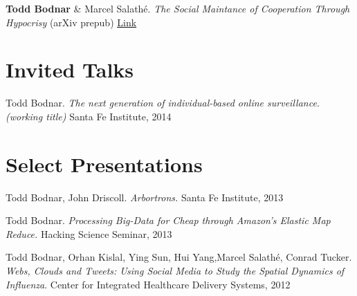 \documentclass[margin,line]{res}
\newcommand{\linkToUrl}[1]{\underline{\color{blue} \href{#1}{Link}}}
\begin{document}
\begin{resume}
\begin{etaremune}[start=3]
\item \textbf{Todd Bodnar} \& Marcel Salath\'e. \textit{The Social Maintance of Cooperation Through Hypocrisy} (arXiv prepub) \linkToUrl{http://bit.ly/Yr965L}

\end{etaremune}

\section{\sc Invited Talks}
\begin{etaremune}[start=1]
\item Todd Bodnar. \textit{The next generation of individual-based online surveillance.(working title)} Santa Fe Institute, 2014
\end{etaremune}  

\section{\sc Select Presentations}
\begin{etaremune}[start=3]
\item Todd Bodnar, John Driscoll. \textit{Arbortrons.} Santa Fe Institute, 2013
\item Todd Bodnar. \textit{Processing Big-Data for Cheap through Amazon's Elastic Map Reduce.} Hacking Science Seminar, 2013
\item Todd Bodnar, Orhan Kislal, Ying Sun, Hui Yang,Marcel Salath\'e, Conrad 
Tucker. \textit{Webs, Clouds and Tweets: Using Social Media to Study the Spatial Dynamics of Influenza}. Center for Integrated Healthcare Delivery Systems, 2012 
\end{etaremune}



\end{resume}
\end{document}
